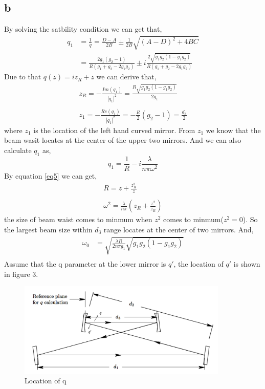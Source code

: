 \documentclass{article}
\begin{document}
\subsection{b}
By solving the satbility condition we can get that,
\begin{equation}\label{eq4}
	\begin{aligned}
	q_1&=\frac{1}{q}=\frac{D-A}{2B}\pm\frac{1}{2B}\sqrt{(A-D)^2+4BC}\\
	&=\frac{2g_1(g_2-1)}{R(g_1+g_2-2g_1g_2)}\pm i\frac{2\sqrt{g_1g_2(1-g_1g_2)}}{R(g_1+g_2-2g_1g_2)}
	\end{aligned}
\end{equation}
Due to that $q(z)=iz_R+z$ we can derive that,
\begin{equation}\label{key}
	\begin{array}{l}
		z_R=-\frac{Im(q_1)}{|q_1|^2}=\frac{R\sqrt{g_1g_2(1-g_1g_2)}}{2g_1}\\
		\\
		z_1=-\frac{Re(q_1)}{|q_1|^2}=-\frac{R}{2}(g_2-1)=\frac{d_3}{2}
	\end{array}
\end{equation}
where $z_1$ is the location of the left hand curved mirror. From $z_1$ we know that the beam wasit locates at the center of the upper two mirrors. And we can also calculate $q_1$ as,
\begin{equation}\label{eq5}
q_1=\frac{1}{R}-i\frac{\lambda}{n\pi\omega^2}
\end{equation}
By equation \ref{eq5} we can get,
\begin{equation}\label{eq6}
	\begin{array}{l}
	R=z+\frac{z_R^2}{z}\\
	\\
	\omega^2=\frac{\lambda}{n\pi}(z_R+\frac{z^2}{z_R})
	\end{array}
\end{equation}
the size of beam waist comes to minmum when $ z^2 $ comes to minmum($ z^2=0 $). So the largest beam size within $ d_3 $ range locates at the center of two mirrors. And,
\begin{equation}\label{eq7}
	\begin{aligned}
		\omega_0&=\sqrt{\frac{\lambda R}{2n\pi g_1}\sqrt{g_1g_2(1-g_1g_2)}}\\
	\end{aligned}
\end{equation}
Assume that the q parameter at the lower mirror is $q'$, the location of $ q' $ is shown in figure 3.
\begin{figure}[ht]
	\centering
	\includegraphics[width=10cm]{f3.png}
	\caption{Location of q}
\end{figure}
\end{document}
